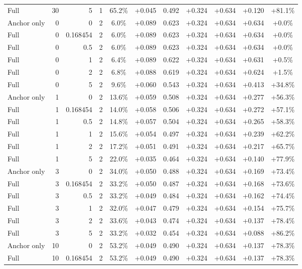 \begin{table}[htbp]
\begin{tabular}{lrrrccccccc}
Full & 30 & 5 & 1 & 65.2\% & +0.045 & 0.492 & +0.324 & +0.634 & +0.120 & +81.1\% \\
Anchor only & 0 & 0 & 2 & 6.0\% & +0.089 & 0.623 & +0.324 & +0.634 & +0.634 & +0.0\% \\
Full & 0 & 0.168454 & 2 & 6.0\% & +0.089 & 0.623 & +0.324 & +0.634 & +0.634 & +0.0\% \\
Full & 0 & 0.5 & 2 & 6.0\% & +0.089 & 0.623 & +0.324 & +0.634 & +0.634 & +0.0\% \\
Full & 0 & 1 & 2 & 6.4\% & +0.089 & 0.622 & +0.324 & +0.634 & +0.631 & +0.5\% \\
Full & 0 & 2 & 2 & 6.8\% & +0.088 & 0.619 & +0.324 & +0.634 & +0.624 & +1.5\% \\
Full & 0 & 5 & 2 & 9.6\% & +0.060 & 0.543 & +0.324 & +0.634 & +0.413 & +34.8\% \\
Anchor only & 1 & 0 & 2 & 13.6\% & +0.059 & 0.508 & +0.324 & +0.634 & +0.277 & +56.3\% \\
Full & 1 & 0.168454 & 2 & 14.0\% & +0.058 & 0.506 & +0.324 & +0.634 & +0.272 & +57.1\% \\
Full & 1 & 0.5 & 2 & 14.8\% & +0.057 & 0.504 & +0.324 & +0.634 & +0.265 & +58.3\% \\
Full & 1 & 1 & 2 & 15.6\% & +0.054 & 0.497 & +0.324 & +0.634 & +0.239 & +62.2\% \\
Full & 1 & 2 & 2 & 17.2\% & +0.051 & 0.491 & +0.324 & +0.634 & +0.217 & +65.7\% \\
Full & 1 & 5 & 2 & 22.0\% & +0.035 & 0.464 & +0.324 & +0.634 & +0.140 & +77.9\% \\
Anchor only & 3 & 0 & 2 & 34.0\% & +0.050 & 0.488 & +0.324 & +0.634 & +0.169 & +73.4\% \\
Full & 3 & 0.168454 & 2 & 33.2\% & +0.050 & 0.487 & +0.324 & +0.634 & +0.168 & +73.6\% \\
Full & 3 & 0.5 & 2 & 33.2\% & +0.049 & 0.484 & +0.324 & +0.634 & +0.162 & +74.4\% \\
Full & 3 & 1 & 2 & 32.0\% & +0.047 & 0.479 & +0.324 & +0.634 & +0.154 & +75.7\% \\
Full & 3 & 2 & 2 & 33.6\% & +0.043 & 0.474 & +0.324 & +0.634 & +0.137 & +78.4\% \\
Full & 3 & 5 & 2 & 33.2\% & +0.032 & 0.454 & +0.324 & +0.634 & +0.088 & +86.2\% \\
Anchor only & 10 & 0 & 2 & 53.2\% & +0.049 & 0.490 & +0.324 & +0.634 & +0.137 & +78.3\% \\
Full & 10 & 0.168454 & 2 & 53.2\% & +0.049 & 0.490 & +0.324 & +0.634 & +0.137 & +78.3\% \\

\end{tabular}
\end{table}

